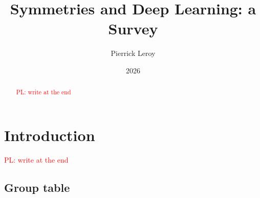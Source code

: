 \documentclass{article}
\title{Symmetries and Deep Learning: a Survey}
\author{Pierrick Leroy}
\date{2026}
\theoremstyle{definition}
\theoremstyle{remark}
\theoremstyle{resultstyle}
\newcommand{\pnote}[1]{\textcolor{red}{PL: #1}}
\begin{document}
\maketitle

\begin{abstract}

\pnote{write at the end}

\end{abstract}

\section{Introduction}

\pnote{write at the end}



\newpage
\begin{appendices}

\section{Group table}

\end{appendices}

\printbibliography

% 
\end{document}
